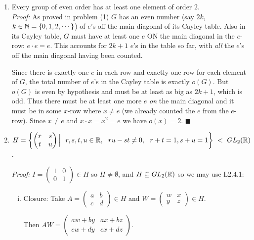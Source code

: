 \begin{enumerate}
    $m=2k$ where $k$ is the number of pairings of \textit{different} elements which are inverses with each other. $\blacksquare$
    \item Every group of even order has at least one element of order $2$.\\
\textit{Proof:} As proved in problem (1) $G$ has an even number (say $2k$, $k\in {\mathbb{N}} = \{0,1,2, \cdots \}$) of $e$'s off the 
main diagonal of its Cayley table. Also in its Cayley table, $G$ must have at least one $e$ ON the main diagonal in the $e$-row: $e\cdot e = e$. This accounts for $2k+1$ $e$'s in the table so far, with \textit{all} the $e$'s off the main diagonal having been counted. \steezybreak

Since there is exactly one $e$ in each row and exactly one row for each element of $G$, the total number of $e$'s in the Cayley table is exactly $o(G)$. But $o(G)$ is even by hypothesis and must be at least as big as $2k+1$, which is odd. Thus there must be at least one more $e$ \textit{on} the main diagonal and it must be in some $x$-row where $x\neq e$ (we already counted the $e$ from the $e$-row).
Since $x\neq e$ and $x\cdot x = x^2 =e$ we have $o(x)=2$. $\blacksquare$
\newpage 
\item $H = \left\{ \begin{pmatrix}
r & s \\ t & u
\end{pmatrix} \Big| \ \ r,s,t,u \in {\mathbb{R}}, \ \ ru-st \neq 0, \ \ r+t=1, s+u =1 \right\} \ < \ GL_2({\mathbb{R}})$.

\textit{Proof:} $I = \begin{pmatrix}
    1 & 0 \\ 0 & 1
\end{pmatrix} \in H$ so $H\neq \emptyset$, and $H\subseteq GL_2({\mathbb{R}})$ so we may use L2.4.1:
\begin{enumerate}[i)]
    \item Closure: Take $A=\begin{pmatrix}
        a & b \\ c&d
    \end{pmatrix} \in H$ and $W=\begin{pmatrix}
        w & x \\ y&z
    \end{pmatrix} \in H.$

    Then $AW = \begin{pmatrix}
        aw+by & ax+bz \\ 
        cw+dy & cx+dz
    \end{pmatrix}$.


\end{enumerate}
\end{enumerate}
